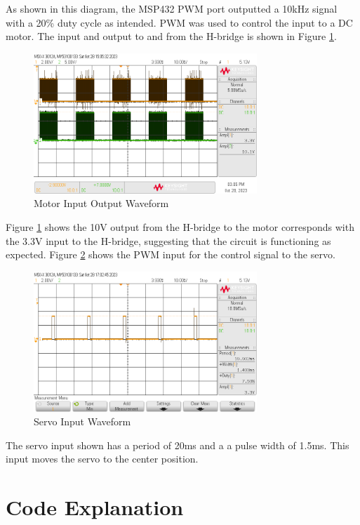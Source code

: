 \documentclass[CMPE]{KGCOEReport}
\begin{document}
As shown in this diagram, the MSP432 PWM port outputted a 10kHz signal with a 20\% duty cycle as intended. PWM was used to control the input to a DC motor. The input and output to and from the H-bridge is shown in Figure \ref{fig:motor}. 

\begin{figure}[H]
    \centering
    \includegraphics[width=0.75\textwidth]{MotorIO.png}
    \caption{Motor Input Output Waveform}
    \label{fig:motor}
\end{figure}

Figure \ref{fig:motor} shows the 10V output from the H-bridge to the motor corresponds with the 3.3V input to the H-bridge, suggesting that the circuit is functioning as expected. Figure \ref{fig:ServoWave} shows the PWM input for the control signal to the servo. 

\begin{figure}[H]
    \centering
    \includegraphics[width=0.75\textwidth]{ServoWave.png}
    \caption{Servo Input Waveform}
    \label{fig:ServoWave}
\end{figure}

The servo input shown has a period of 20ms and a a pulse width of 1.5ms. This input moves the servo to the center position.

\section*{Code Explanation}
\end{document}
